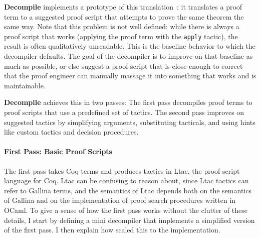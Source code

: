 

\textbf{Decompile} implements a prototype of this translation~\href{https://github.com/uwplse/coq-plugin-lib/tree/9ef05815c261de9c99b604c6b581ba1c4fbc1a46/src/coq/decompiler/decompiler.ml}{}: %
it translates a proof term to a suggested proof script that attempts to prove the same theorem 
the same way.
Note that this problem is not well defined: while there is always a proof script that 
works (applying the proof term with the \lstinline{apply} tactic), the result is often qualitatively unreadable.
This is the baseline behavior to which the decompiler defaults.
The goal of the decompiler is to improve on that baseline as much as possible,
or else suggest a proof script that is close enough to correct that the proof engineer can
manually massage it into something that works and is maintainable.

\textbf{Decompile} achieves this in two passes: The first pass decompiles proof terms to proof scripts that use a predefined set of tactics.
The second pass improves on suggested tactics by simplifying arguments, substituting tacticals, and using
hints like custom tactics and decision procedures. %

\paragraph{First Pass: Basic Proof Scripts}
The first pass takes Coq terms and produces tactics in Ltac, the proof script language for Coq.
Ltac can be confusing to reason about, since Ltac tactics can refer to Gallina terms, and the semantics of Ltac depends both on the
semantics of Gallina and on the implementation of proof search procedures written in OCaml.
To give a sense of how the first pass works without the clutter of these details, I start by defining a mini decompiler that 
implements a simplified version of the first pass.
I then explain how  scaled this to the implementation.

